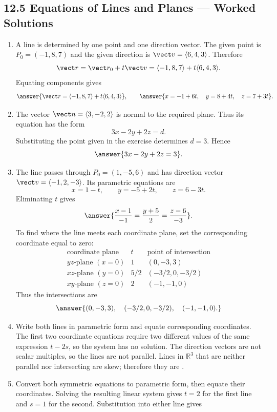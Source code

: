 \subsection*{12.5 Equations of Lines and Planes --- Worked Solutions}
\begin{enumerate}[label=\textbf{\arabic*.}, start=3]
\item A line is determined by one point and one direction vector.  The given point is
$P_0=(-1,8,7)$ and the given direction is $\vect v=\langle6,4,3\rangle$.  Therefore
\[
\vect r=\vect r_0+t\vect v
=\langle-1,8,7\rangle+t\langle6,4,3\rangle.
\]
Equating components gives
\[
\answer{\vect r=\langle-1,8,7\rangle+t\langle6,4,3\rangle},
\qquad
\answer{x=-1+6t,\quad y=8+4t,\quad z=7+3t}.
\]
\setcounter{enumi}{4}
\item The vector $\vect n=\langle3,-2,2\rangle$ is normal to the required plane.  Thus its equation has the form
\[
3x-2y+2z=d.
\]
Substituting the point given in the exercise determines $d=3$.  Hence
\[
\answer{3x-2y+2z=3}.
\]
\setcounter{enumi}{14}
\item The line passes through $P_0=(1,-5,6)$ and has direction vector
$\vect v=\langle-1,2,-3\rangle$.  Its parametric equations are
\[
x=1-t,\qquad y=-5+2t,\qquad z=6-3t.
\]
Eliminating $t$ gives
\[
\answer{\frac{x-1}{-1}=\frac{y+5}{2}=\frac{z-6}{-3}}.
\]
To find where the line meets each coordinate plane, set the corresponding coordinate equal to zero:
\[
\begin{array}{c|c|c}
\text{coordinate plane}&t&\text{point of intersection}\\ \hline
yz\text{-plane }(x=0)&1&(0,-3,3)\\
xz\text{-plane }(y=0)&5/2&(-3/2,0,-3/2)\\
xy\text{-plane }(z=0)&2&(-1,-1,0)
\end{array}
\]
Thus the intersections are
\[\answer{(0,-3,3),\quad(-3/2,0,-3/2),\quad(-1,-1,0).}\]
\setcounter{enumi}{18}
\item Write both lines in parametric form and equate corresponding coordinates.  The first two coordinate equations require two different values of the same expression $t-2s$, so the system has no solution.  The direction vectors are not scalar multiples, so the lines are not parallel.  Lines in $\mathbb R^3$ that are neither parallel nor intersecting are skew; therefore they are .
\setcounter{enumi}{20}
\item Convert both symmetric equations to parametric form, then equate their coordinates.  Solving the resulting linear system gives $t=2$ for the first line and $s=1$ for the second.  Substitution into either line gives

\end{enumerate}
